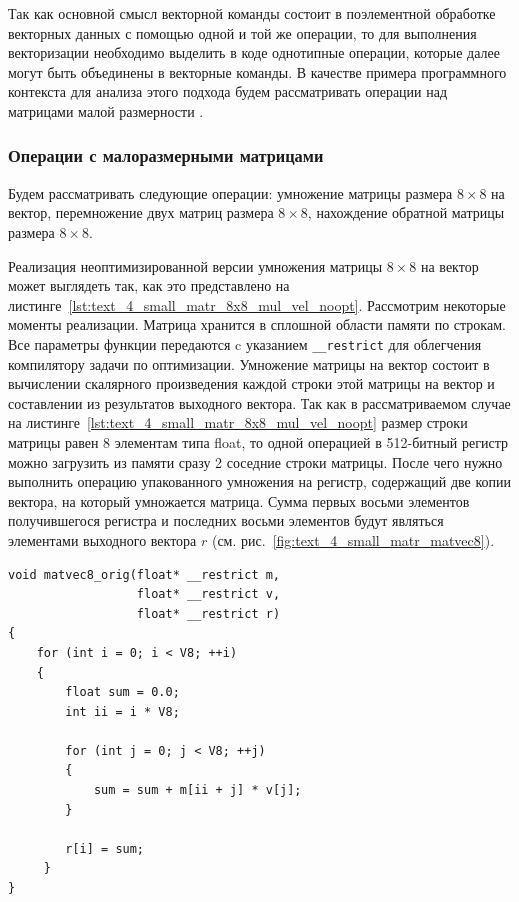 Так как основной смысл векторной команды состоит в поэлементной обработке векторных данных с помощью одной и той же операции, то для выполнения векторизации необходимо выделить в коде однотипные операции, которые далее могут быть объединены в векторные команды.
В качестве примера программного контекста для анализа этого подхода будем рассматривать операции над матрицами малой размерности \cite{Bendersky2018VecMat2}.

\subsubsection{Операции с малоразмерными матрицами}\label{sec:vec_small_matr_opers}

Будем рассматривать следующие операции: умножение матрицы размера $8 \times 8$ на вектор, перемножение двух матриц размера $8 \times 8$, нахождение обратной матрицы размера $8 \times 8$.

Реализация неоптимизированной версии умножения матрицы $8 \times 8$ на вектор может выглядеть так, как это представлено на листинге~\ref{lst:text_4_small_matr_8x8_mul_vel_noopt}.
Рассмотрим некоторые моменты реализации.
Матрица хранится в сплошной области памяти по строкам.
Все параметры функции передаются c указанием \texttt{\_\_restrict} для облегчения компилятору задачи по оптимизации.
Умножение матрицы на вектор состоит в вычислении скалярного произведения каждой строки этой матрицы на вектор и составлении из результатов выходного вектора.
Так как в рассматриваемом случае на листинге~\ref{lst:text_4_small_matr_8x8_mul_vel_noopt} размер строки матрицы равен 8 элементам типа float, то одной операцией в 512-битный регистр можно загрузить из памяти сразу 2 соседние строки матрицы.
После чего нужно выполнить операцию упакованного умножения на регистр, содержащий две копии вектора, на который умножается матрица.
Сумма первых восьми элементов получившегося регистра и последних восьми элементов будут являться элементами выходного вектора $r$ (см. рис.~\ref{fig:text_4_small_matr_matvec8}).

\begin{singlespace}
\begin{lstlisting}[caption={Невекторизованная версия умножения матрицы \\ размера $8 \times 8$ на вектор.},label={lst:text_4_small_matr_8x8_mul_vel_noopt}]
void matvec8_orig(float* __restrict m,
                  float* __restrict v,
                  float* __restrict r)
{
    for (int i = 0; i < V8; ++i)
    {
        float sum = 0.0;
        int ii = i * V8;

        for (int j = 0; j < V8; ++j)
        {
            sum = sum + m[ii + j] * v[j];
        }

        r[i] = sum;
     }
}
\end{lstlisting}
\end{singlespace}

